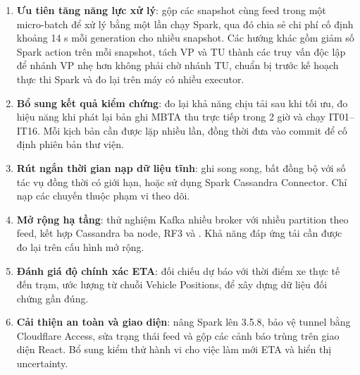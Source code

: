 \begin{enumerate}
    \item \textbf{Ưu tiên tăng năng lực xử lý}: gộp các snapshot cùng feed trong một micro-batch để xử lý bằng một lần chạy Spark, qua đó chia sẻ chi phí cố định khoảng 14 s mỗi generation cho nhiều snapshot. Các hướng khác gồm giảm số Spark action trên mỗi snapshot, tách VP và TU thành các truy vấn độc lập để nhánh VP nhẹ hơn không phải chờ nhánh TU, chuẩn bị trước kế hoạch thực thi Spark và đo lại trên máy có nhiều executor.
    \item \textbf{Bổ sung kết quả kiểm chứng}: đo lại khả năng chịu tải sau khi tối ưu, đo hiệu năng khi phát lại bản ghi MBTA thu trực tiếp trong 2 giờ và chạy IT01--IT16. Mỗi kịch bản cần được lặp nhiều lần, đồng thời đưa  vào commit để cố định phiên bản thư viện.
    \item \textbf{Rút ngắn thời gian nạp dữ liệu tĩnh}: ghi  song song, bất đồng bộ với số tác vụ đồng thời có giới hạn, hoặc sử dụng Spark Cassandra Connector. Chỉ nạp các chuyến thuộc phạm vi theo dõi.
    \item \textbf{Mở rộng hạ tầng}: thử nghiệm Kafka nhiều broker với nhiều partition theo feed, kết hợp Cassandra ba node, RF3 và . Khả năng đáp ứng tải cần được đo lại trên cấu hình mở rộng.
    \item \textbf{Đánh giá độ chính xác ETA}: đối chiếu dự báo với thời điểm xe thực tế đến trạm, ước lượng từ chuỗi Vehicle Positions, để xây dựng dữ liệu đối chứng gần đúng.
    \item \textbf{Cải thiện an toàn và giao diện}: nâng Spark lên 3.5.8, bảo vệ tunnel bằng Cloudflare Access, sửa trạng thái feed và gộp các cảnh báo trùng trên giao diện React. Bổ sung kiểm thử hành vi cho việc làm mới ETA và hiển thị uncertainty.
\end{enumerate}
